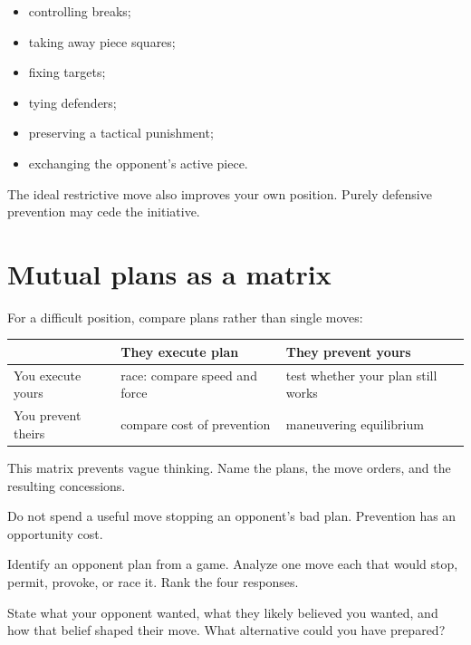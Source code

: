 \begin{itemize}[leftmargin=1.4em]
\item controlling breaks;
\item taking away piece squares;
\item fixing targets;
\item tying defenders;
\item preserving a tactical punishment;
\item exchanging the opponent's active piece.
\end{itemize}

The ideal restrictive move also improves your own position. Purely defensive prevention may cede the initiative.

\section{Mutual plans as a matrix}
For a difficult position, compare plans rather than single moves:

\begin{center}
\begin{tabularx}{.92\textwidth}{p{}YY}
\toprule
& \textbf{They execute plan} & \textbf{They prevent yours}\\
\midrule
You execute yours & race: compare speed and force & test whether your plan still works\\
You prevent theirs & compare cost of prevention & maneuvering equilibrium\\
\bottomrule
\end{tabularx}
\end{center}

This matrix prevents vague thinking. Name the plans, the move orders, and the resulting concessions.

\begin{warningbox}
Do not spend a useful move stopping an opponent's bad plan. Prevention has an opportunity cost.
\end{warningbox}

\begin{exercise}
Identify an opponent plan from a game. Analyze one move each that would stop, permit, provoke, or race it. Rank the four responses.
\end{exercise}

\begin{exercise}
State what your opponent wanted, what they likely believed you wanted, and how that belief shaped their move. What alternative could you have prepared?
\end{exercise}

